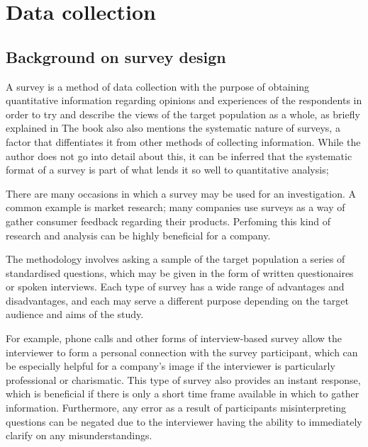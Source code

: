 \chapter{Data collection}

\section{Background on survey design}


A survey is a method of data collection with the purpose of obtaining quantitative information regarding opinions and 
experiences of the respondents in order to try and describe the views of the target population as a whole, as briefly explained
in %
The book also also mentions the systematic nature of surveys, a factor that diffentiates it from other methods of collecting
information. While the author does not go into detail about this, it can be inferred that the systematic format of a survey is part of 
what lends it so well to quantitative analysis; %

There are many occasions in which a survey may be used for an investigation. A common example is market research; many 
companies use surveys as a way of gather consumer feedback regarding their products. Perfoming this kind of research and analysis
can be highly beneficial for a company. %

The methodology involves asking a sample of the target population a series of standardised questions, which may be given in 
the form of written questionaires or spoken interviews. Each type of survey has a wide range of advantages and disadvantages, 
and each may serve a different purpose depending on the target audience and aims of the study. 

For example, phone calls and other forms of interview-based survey allow the interviewer to form a personal connection with 
the survey participant, which can be especially helpful for a company's image if the interviewer is particularly professional 
or charismatic. This type of survey also provides an instant response, which is beneficial if there is only a short time frame 
available in which to gather information. Furthermore, any error as a result of participants misinterpreting questions can be 
negated due to the interviewer having the ability to immediately clarify on any misunderstandings. 

